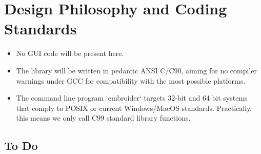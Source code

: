 \documentclass[onesize, a4paper]{refart}
\begin{document}
\section{Design Philosophy and Coding Standards}

\begin{itemize} 
\item No GUI code will be present here.
\item The library will be written in pedantic ANSI C/C90, aiming for no compiler warnings under GCC for compatibility with the most possible platforms.
\item The command line program `embroider` targets 32-bit and 64 bit systems that comply to POSIX or current Windows/MacOS standards. Practically, this means we only call C99 standard library functions.
\end{itemize}

\subsection{To Do}
\end{document}
